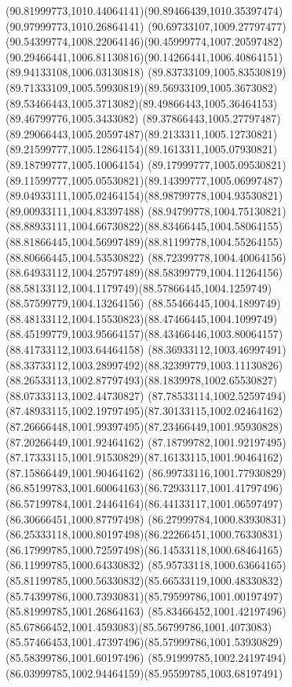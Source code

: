 {{\curveto(90.81999773,1010.44064141)(90.89466439,1010.35397474)(90.97999773,1010.26864141)
\curveto(90.69733107,1009.27797477)(90.54399774,1008.22064146)(90.45999774,1007.20597482)
\curveto(90.29466441,1006.81130816)(90.14266441,1006.40864151)(89.94133108,1006.03130818)
\curveto(89.83733109,1005.83530819)(89.71333109,1005.59930819)(89.56933109,1005.3673082)
\curveto(89.53466443,1005.3713082)(89.49866443,1005.36464153)(89.46799776,1005.3433082)
\curveto(89.37866443,1005.27797487)(89.29066443,1005.20597487)(89.2133311,1005.12730821)
\curveto(89.21599777,1005.12864154)(89.1613311,1005.07930821)(89.18799777,1005.10064154)
\curveto(89.17999777,1005.09530821)(89.11599777,1005.05530821)(89.14399777,1005.06997487)
\curveto(89.04933111,1005.02464154)(88.98799778,1004.93530821)(89.00933111,1004.83397488)
\curveto(88.94799778,1004.75130821)(88.88933111,1004.66730822)(88.83466445,1004.58064155)
\curveto(88.81866445,1004.56997489)(88.81199778,1004.55264155)(88.80666445,1004.53530822)
\curveto(88.72399778,1004.40064156)(88.64933112,1004.25797489)(88.58399779,1004.11264156)
\curveto(88.58133112,1004.1179749)(88.57866445,1004.1259749)(88.57599779,1004.13264156)
\curveto(88.55466445,1004.1899749)(88.48133112,1004.15530823)(88.47466445,1004.1099749)
\curveto(88.45199779,1003.95664157)(88.43466446,1003.80064157)(88.41733112,1003.64464158)
\curveto(88.36933112,1003.46997491)(88.33733112,1003.28997492)(88.32399779,1003.11130826)
\curveto(88.26533113,1002.87797493)(88.1839978,1002.65530827)(88.07333113,1002.44730827)
\curveto(87.78533114,1002.52597494)(87.48933115,1002.19797495)(87.30133115,1002.02464162)
\curveto(87.26666448,1001.99397495)(87.23466449,1001.95930828)(87.20266449,1001.92464162)
\curveto(87.18799782,1001.92197495)(87.17333115,1001.91530829)(87.16133115,1001.90464162)
\lineto(87.15866449,1001.90464162)
\curveto(86.99733116,1001.77930829)(86.85199783,1001.60064163)(86.72933117,1001.41797496)
\curveto(86.57199784,1001.24464164)(86.44133117,1001.06597497)(86.30666451,1000.87797498)
\curveto(86.27999784,1000.83930831)(86.25333118,1000.80197498)(86.22266451,1000.76330831)
\curveto(86.17999785,1000.72597498)(86.14533118,1000.68464165)(86.11999785,1000.64330832)
\curveto(85.95733118,1000.63664165)(85.81199785,1000.56330832)(85.66533119,1000.48330832)
\curveto(85.74399786,1000.73930831)(85.79599786,1001.00197497)(85.81999785,1001.26864163)
\curveto(85.83466452,1001.42197496)(85.67866452,1001.4593083)(85.56799786,1001.4073083)
\curveto(85.57466453,1001.47397496)(85.57999786,1001.53930829)(85.58399786,1001.60197496)
\curveto(85.91999785,1002.24197494)(86.03999785,1002.94464159)(85.95599785,1003.68197491)
}}
